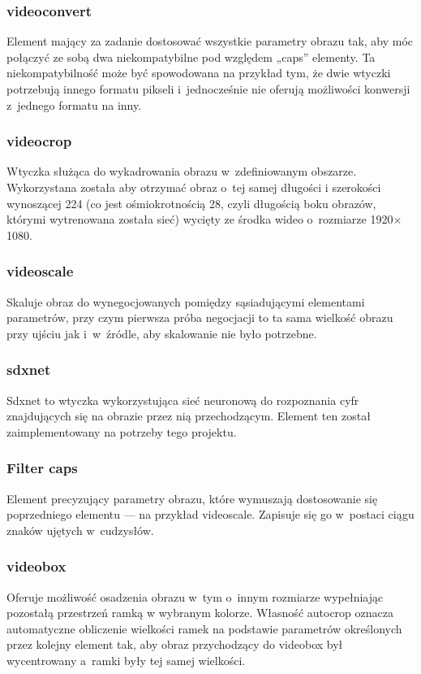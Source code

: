 \documentclass[12pt, oneside, a4paper]{article}
\begin{document}
\subsubsection{videoconvert}\label{sec:videoconvert}
Element mający za zadanie dostosować wszystkie parametry obrazu tak,
aby móc połączyć ze sobą dwa niekompatybilne pod względem „caps” elementy.
Ta niekompatybilność może być spowodowana na przykład tym, że dwie
wtyczki potrzebują innego formatu pikseli i~jednocześnie nie oferują
możliwości konwersji z~jednego formatu na inny.

\subsubsection{videocrop}\label{sec:videocrop}
Wtyczka służąca do wykadrowania obrazu w~zdefiniowanym obszarze.
Wykorzystana została aby otrzymać obraz o~tej samej długości
i szerokości wynoszącej 224 (co jest ośmiokrotnością 28, czyli
długością boku obrazów, którymi wytrenowana została sieć) wycięty
ze środka wideo o~rozmiarze 1920\(\times \)1080.

\subsubsection{videoscale}\label{sec:videoscale}
Skaluje obraz do wynegocjowanych pomiędzy sąsiadującymi elementami
parametrów, przy czym pierwsza próba negocjacji to ta sama wielkość
obrazu przy ujściu jak i~w~źródle, aby skalowanie nie było potrzebne.

\subsubsection{sdxnet}\label{sec:sdxnet}
Sdxnet to wtyczka wykorzystująca sieć neuronową do rozpoznania cyfr
znajdujących się na obrazie przez nią przechodzącym. Element ten został
zaimplementowany na potrzeby tego projektu.

\subsubsection{Filter caps}\label{sec:Filter caps}
Element precyzujący parametry obrazu, które wymuszają
dostosowanie się poprzedniego elementu --- na przykład videoscale.
Zapisuje się go w~postaci ciągu znaków ujętych w~cudzysłów.

\subsubsection{videobox}\label{sec:videobox}
Oferuje możliwość osadzenia obrazu w~tym o~innym
rozmiarze wypełniając pozostałą przestrzeń ramką
w wybranym kolorze. Własność autocrop oznacza automatyczne obliczenie
wielkości ramek na podstawie parametrów określonych przez kolejny element tak,
aby obraz przychodzący do videobox był wycentrowany a~ramki
były tej samej wielkości.
\end{document}
